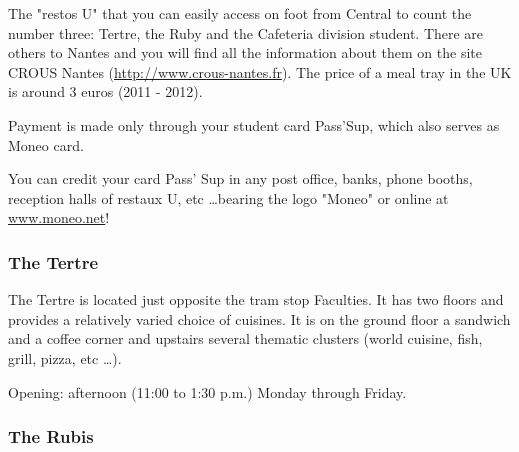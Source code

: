 
The "restos U" that you can easily access on foot from Central to count the number three: Tertre, the Ruby and the Cafeteria division student. There are others to Nantes and you will find all the information about them on the site CROUS Nantes (\url{http://www.crous-nantes.fr}). The price of a meal tray in the UK is around 3 euros (2011 - 2012).

Payment is made only through your student card Pass'Sup, which also serves as Moneo card.

You can credit your card Pass' Sup in any post office, banks, phone booths, reception halls of restaux U, etc \dots bearing the logo "Moneo" or online at \url{www.moneo.net}!

\subsubsection{The Tertre}


The Tertre is located just opposite the tram stop Faculties. It has two floors and provides a relatively varied choice of cuisines.
It is on the ground floor a sandwich and a coffee corner and upstairs several thematic clusters (world cuisine, fish, grill, pizza, etc \dots).

Opening: afternoon (11:00 to 1:30 p.m.) Monday through Friday.
\subsubsection{The Rubis}

